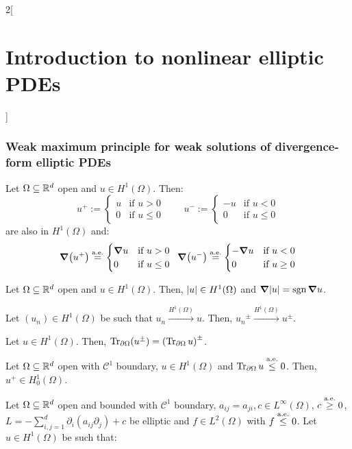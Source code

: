 \documentclass[../../../main_math.tex]{subfiles}
\begin{document}
\begin{multicols}{2}[\section{Introduction to nonlinear elliptic PDEs}]
  \subsubsection{Weak maximum principle for weak solutions of divergence-form elliptic PDEs}
  \begin{lemma}\label{INEPDE:lemma1_weak_max}
    Let $\Omega\subseteq\mathbb{R}^d$ open and $u\in H^1(\Omega)$. Then:
    $$
      u^{+}:=\begin{cases}
        u & \text{if }u> 0    \\
        0 & \text{if }u\leq 0
      \end{cases}\qquad
      u^{-}:=\begin{cases}
        -u & \text{if }u< 0    \\
        0  & \text{if }u\leq 0
      \end{cases}
    $$
    are also in $H^1(\Omega)$ and:
    $$
      \grad(u^+)\overset{\text{a.e.}}{=}\begin{cases}
        \grad u & \text{if }u>0     \\
        0       & \text{if }u\leq 0
      \end{cases}\;\;
      \grad(u^-)\overset{\text{a.e.}}{=}\begin{cases}
        -\grad u & \text{if }u<0     \\
        0        & \text{if }u\geq 0
      \end{cases}
    $$
  \end{lemma}
  \begin{corollary}
    Let $\Omega\subseteq\mathbb{R}^d$ open and $u\in H^1(\Omega)$. Then, $\abs{u}\in H^1(\Omega)$ and $\grad{\abs{u}}=\operatorname{sgn}\grad{u}$.
  \end{corollary}
  \begin{lemma}
    Let $(u_n)\in H^1(\Omega)$ be such that $u_n\overset{H^1(\Omega)}{\longrightarrow} u$. Then, ${u_n}^\pm\overset{H^1(\Omega)}{\longrightarrow} u^\pm$.
  \end{lemma}
  \begin{corollary}
    Let $u\in H^1(\Omega)$. Then, $\Tr_{\partial\Omega}(u^\pm)={(\Tr_{\partial\Omega}u)}^\pm$.
  \end{corollary}
  \begin{lemma}
    Let $\Omega\subseteq\mathbb{R}^d$ open with $\mathcal{C}^1$ boundary, $u\in H^1(\Omega)$ and $\Tr_{\partial\Omega}u\overset{\text{a.e.}}{\leq}0$. Then, $u^+\in H^1_0(\Omega)$.
  \end{lemma}
  \begin{theorem}
    Let $\Omega\subseteq\mathbb{R}^d$ open and bounded with $\mathcal{C}^1$ boundary, $a_{ij}=a_{ji},c\in L^\infty(\Omega)$, $c\overset{\text{a.e.}}{\geq}0$, $L=-\sum_{i,j=1}^d\partial_i(a_{ij}\partial_j)+c$ be elliptic and $f\in L^2(\Omega)$ with $f\overset{\text{a.e.}}{\leq} 0$. Let $u\in H^1(\Omega)$ be such that:

\end{theorem}
\end{multicols}
\end{document}
